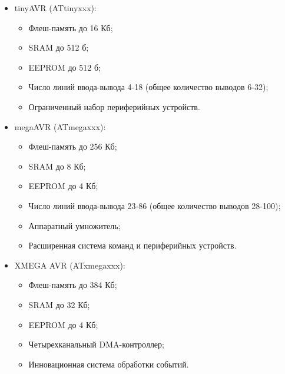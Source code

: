 \documentclass[12pt, oneside]{altsu-report}
\begin{document}
\begin{itemize}
    \item tinyAVR (ATtinyxxx):
    \begin{itemize}
        \item Флеш-память до 16 Кб;
    
        \item SRAM до 512 б;
    
        \item EEPROM до 512 б;
    
        \item Число линий ввода-вывода 4-18 (общее количество выводов 6-32);
    
        \item Ограниченный набор периферийных устройств.
    \end{itemize}
    
    \item megaAVR (ATmegaxxx):
    \begin{itemize}
        \item Флеш-память до 256 Кб;
    
        \item SRAM до 8 Кб;
    
        \item EEPROM до 4 Кб;
    
        \item Число линий ввода-вывода 23-86 (общее количество выводов 28-100);
    
        \item Аппаратный умножитель;
    
        \item Расширенная система команд и периферийных устройств.
    \end{itemize}
    
    \item XMEGA AVR (ATxmegaxxx):
    \begin{itemize}
        \item Флеш-память до 384 Кб;
    
        \item SRAM до 32 Кб;
    
        \item EEPROM до 4 Кб;
    
        \item Четырехканальный DMA-контроллер;
    
        \item Инновационная система обработки событий.
    \end{itemize}
\end{itemize}
\end{document}
